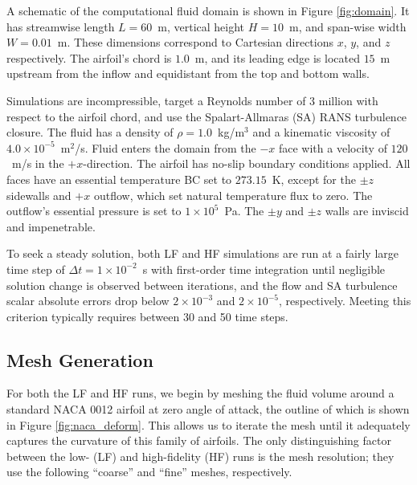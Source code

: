 \documentclass[11pt]{article}
\begin{document}
A schematic of the computational fluid domain is shown in Figure \ref{fig:domain}. It has streamwise length $L = 60$~m, vertical height $H = 10$~m, and span-wise width $W = 0.01$~m. These dimensions correspond to Cartesian directions $x$, $y$, and $z$ respectively. The airfoil's chord is $1.0$~m, and its leading edge is located $15$~m upstream from the inflow and equidistant from the top and bottom walls.

Simulations are incompressible, target a Reynolds number of 3 million with respect to the airfoil chord, and use the Spalart-Allmaras (SA) RANS turbulence closure. The fluid has a density of $\rho = 1.0$~kg/m$^3$ and a kinematic viscosity of $4.0 \times 10^{-5}$~m$^2$/s. Fluid enters the domain from the $-x$ face with a velocity of $120$~m/s in the $+x$-direction. The airfoil has no-slip boundary conditions applied. All faces have an essential temperature BC set to $273.15$~K, except for the $\pm z$ sidewalls and $+x$ outflow, which set natural temperature flux to zero. The outflow's essential pressure is set to $1\times 10^{5}$~Pa. The $\pm y$ and $\pm z$ walls are inviscid and impenetrable.

To seek a steady solution, both LF and HF simulations are run at a fairly large time step of $\Delta t = 1 \times 10^{-2}$~s with first-order time integration until negligible solution change is observed between iterations, and the flow and SA turbulence scalar absolute errors drop below $2 \times 10^{-3}$ and $2 \times 10^{-5}$, respectively. Meeting this criterion typically requires between 30 and 50 time steps.

\subsection{Mesh Generation}

For both the LF and HF runs, we begin by meshing the fluid volume around a standard NACA 0012 airfoil at zero angle of attack, the outline of which is shown in Figure \ref{fig:naca_deform}. This allows us to iterate the mesh until it adequately captures the curvature of this family of airfoils. The only distinguishing factor between the low- (LF) and high-fidelity (HF) runs is the mesh resolution; they use the following ``coarse'' and ``fine'' meshes, respectively.
\end{document}

